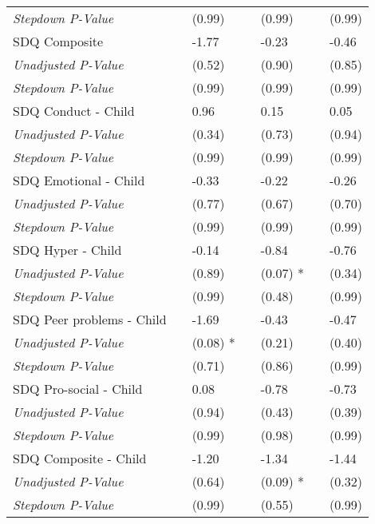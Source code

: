 \begin{tabular}{L{9cm} L{1cm} l L{1cm} l l l}
\quad \textit{Stepdown P-Value} & & (0.99)  & & (0.99)  & & (0.99) \\[3pt]
SDQ Composite & & -1.77 & & -0.23  & & -0.46 \\
\quad \textit{Unadjusted P-Value} & & (0.52)  & & (0.90)  & & (0.85) \\
\quad \textit{Stepdown P-Value} & & (0.99)  & & (0.99)  & & (0.99) \\[3pt]
SDQ Conduct - Child & & 0.96 & & 0.15  & & 0.05 \\
\quad \textit{Unadjusted P-Value} & & (0.34)  & & (0.73)  & & (0.94) \\
\quad \textit{Stepdown P-Value} & & (0.99)  & & (0.99)  & & (0.99) \\[3pt]
SDQ Emotional - Child & & -0.33 & & -0.22  & & -0.26 \\
\quad \textit{Unadjusted P-Value} & & (0.77)  & & (0.67)  & & (0.70) \\
\quad \textit{Stepdown P-Value} & & (0.99)  & & (0.99)  & & (0.99) \\[3pt]
SDQ Hyper - Child & & -0.14 & & -0.84  & & -0.76 \\
\quad \textit{Unadjusted P-Value} & & (0.89)  & & (0.07) * & & (0.34) \\
\quad \textit{Stepdown P-Value} & & (0.99)  & & (0.48)  & & (0.99) \\[3pt]
SDQ Peer problems - Child & & -1.69 & & -0.43  & & -0.47 \\
\quad \textit{Unadjusted P-Value} & & (0.08) * & & (0.21)  & & (0.40) \\
\quad \textit{Stepdown P-Value} & & (0.71)  & & (0.86)  & & (0.99) \\[3pt]
SDQ Pro-social - Child & & 0.08 & & -0.78  & & -0.73 \\
\quad \textit{Unadjusted P-Value} & & (0.94)  & & (0.43)  & & (0.39) \\
\quad \textit{Stepdown P-Value} & & (0.99)  & & (0.98)  & & (0.99) \\[3pt]
SDQ Composite - Child & & -1.20 & & -1.34  & & -1.44 \\
\quad \textit{Unadjusted P-Value} & & (0.64)  & & (0.09) * & & (0.32) \\
\quad \textit{Stepdown P-Value} & & (0.99)  & & (0.55)  & & (0.99) \\[3pt]
\bottomrule
\end{tabular}

